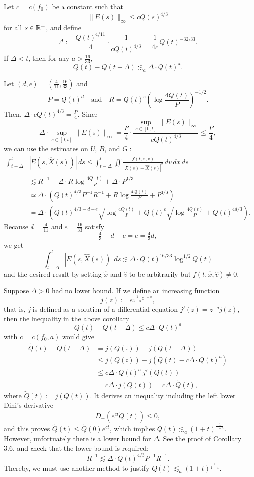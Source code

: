 \documentclass[12pt]{article}
\begin{document}
\begin{cor}
Let $c=c(f_0)$ be a constant such that
\[\|E(s)\|_\infty\le cQ(s)^{4/3}\]
for all $s\in\mathbb{R}^+$, and define
\[\Delta:=\frac{Q(t)^{4/11}}4\cdot\frac1{cQ(t)^{4/3}}=\frac1{4c}\,Q(t)^{-32/33}.\]
If $\Delta<t$, then for any $a>\frac{16}{33}$,
\[Q(t)-Q(t-\Delta)\lesssim_a\Delta\cdot Q(t)^a.\]
\end{cor}
\begin{pf}
Let $(d,e)=(\frac4{11},\frac{16}{33})$ and
\[P=Q(t)^d\quad\text{and}\quad R=Q(t)^e(\log\frac{4Q(t)}P)^{-1/2}.\]
Then, $\Delta\cdot cQ(t)^{4/3}=\frac P4$.
Since
\[\Delta\cdot\sup_{s\in[0,t]}\|E(s)\|_\infty=\frac P4\cdot\frac{\sup_{s\in[0,t]}\|E(s)\|_\infty}{cQ(t)^{4/3}}\le\frac P4,\]
we can use the estimates on $U$, $B$, and $G$ :
\begin{align*}
\int_{t-\Delta}^t&|E(s,\hat X(s))|\,ds
\le\int_{t-\Delta}^t\iint\frac{f(t,x,v)}{|X(s)-\hat X(s)|^2}\,dv\,dx\,ds\\
&\lesssim R^{-1}+\Delta\cdot R\log\frac{4Q(t)}P+\Delta\cdot P^{4/3}\\
&\simeq\Delta\cdot\left(Q(t)^{4/3}P^{-1}R^{-1}+R\log\frac{4Q(t)}P+P^{4/3}\right)\\
&=\Delta\cdot\left(Q(t)^{4/3-d-e}\sqrt{\log\frac{4Q(t)}P}+Q(t)^e\sqrt{\log\frac{4Q(t)}P}+Q(t)^{4d/3}\right).
\end{align*}
Because $d=\frac4{11}$ and $e=\frac{16}{33}$ satisfy
\[\tfrac43-d-e=e=\tfrac43d,\]
we get
\[\int_{t-\Delta}^t|E(s,\hat X(s))|\,ds\lesssim\Delta\cdot Q(t)^{16/33}\log^{1/2}Q(t)\]
and the desired result by setting $\hat x$ and $\hat v$ to be arbitrarily but $f(t,\hat x,\hat v)\ne0$.
\end{pf}
\begin{rmk}
Suppose $\Delta>0$ had no lower bound.
If we define an increasing function
\[j(z):=e^{\frac1{1-a}z^{1-a}},\]
that is, $j$ is defined as a solution of a differential equation $j'(z)=z^{-a}j(z)$, then the inequality in the above corollary
\[Q(t)-Q(t-\Delta)\le c\Delta\cdot Q(t)^a\]
with $c=c(f_0,a)$ would give
\begin{align*}
\tilde Q(t)-\tilde Q(t-\Delta)
&=j(Q(t))-j(Q(t-\Delta))\\
&\le j(Q(t))-j(Q(t)-c\Delta\cdot Q(t)^a)\\
&\le c\Delta\cdot Q(t)^a\ j'(Q(t))\\
&=c\Delta\cdot j(Q(t))=c\Delta\cdot\tilde Q(t),
\end{align*}
where $\tilde Q(t):=j(Q(t))$.
It derives an inequality including the left lower Dini's derivative
\[D_-(e^{ct}\tilde Q(t))\le0,\]
and this proves $\tilde Q(t)\le\tilde Q(0)e^{ct}$, which implies $Q(t)\lesssim_a(1+t)^{\frac1{1-a}}$.
However, unfortuately there is a lower bound for $\Delta$.
See the proof of Corollary 3.6, and check that the lower bound is required:
\[R^{-1}\lesssim\Delta\cdot Q(t)^{4/3}P^{-1}R^{-1}.\]
Thereby, we must use another method to justify $Q(t)\lesssim_a(1+t)^{\frac1{1-a}}$.
\end{rmk}
\end{document}
